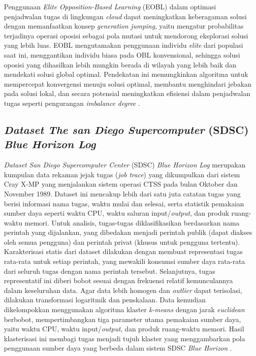 Penggunaan \textit{Elite Opposition-Based Learning} (EOBL) dalam optimasi penjadwalan tugas di lingkungan \textit{cloud} dapat meningkatkan keberagaman solusi dengan memanfaatkan konsep \textit{generation jumping}, yaitu mengatur probabilitas terjadinya operasi oposisi sebagai pola mutasi untuk mendorong eksplorasi solusi yang lebih luas. EOBL mengutamakan penggunaan individu \textit{elite} dari populasi saat ini, menggantikan individu biasa pada OBL konvensional, sehingga solusi oposisi yang dihasilkan lebih mungkin berada di wilayah yang lebih baik dan mendekati solusi global optimal. Pendekatan ini memungkinkan algoritma untuk mempercepat konvergensi menuju solusi optimal, membantu menghindari jebakan pada solusi lokal, dan secara potensial meningkatkan efisiensi dalam penjadwalan tugas seperti pengurangan \textit{imbalance degree} \parencite{Zhou2013}.

\subsection{\textit{Dataset The san Diego Supercomputer} (SDSC) \textit{Blue Horizon Log}}
\textit{Dataset San Diego Supercomputer Center} (SDSC) \textit{Blue Horizon Log} merupakan kumpulan data rekaman jejak tugas (\textit{job trace}) yang dikumpulkan dari sistem Cray X-MP yang menjalankan sistem operasi CTSS pada bulan Oktober dan November 1989. Dataset ini mencakup lebih dari satu juta catatan tugas yang berisi informasi nama tugas, waktu mulai dan selesai, serta statistik pemakaian sumber daya seperti waktu CPU, waktu saluran input/\textit{output}, dan produk ruang-waktu memori. Untuk analisis, tugas-tugas diklasifikasikan berdasarkan nama perintah yang dijalankan, yang dibedakan menjadi perintah publik (dapat diakses oleh semua pengguna) dan perintah privat (khusus untuk pengguna tertentu). Karakterisasi statis dari dataset dilakukan dengan membuat representasi tugas rata-rata untuk setiap perintah, yang mewakili konsumsi sumber daya rata-rata dari seluruh tugas dengan nama perintah tersebut. Selanjutnya, tugas representatif ini diberi bobot sesuai dengan frekuensi relatif kemunculannya dalam keseluruhan data. Agar data lebih homogen dan \textit{outlier} dapat terisolasi, dilakukan transformasi logaritmik dan penskalaan. Data kemudian dikelompokkan menggunakan algoritma klaster \textit{k-means} dengan jarak \textit{euclidean} berbobot, mempertimbangkan tiga parameter utama pemakaian sumber daya, yaitu waktu CPU, waktu input/\textit{output}, dan produk ruang-waktu memori. Hasil klasterisasi ini membagi tugas menjadi tujuh klaster yang menggambarkan pola penggunaan sumber daya yang berbeda dalam sistem SDSC \textit{Blue Horizon} \parencite{Pasquale1988}.

